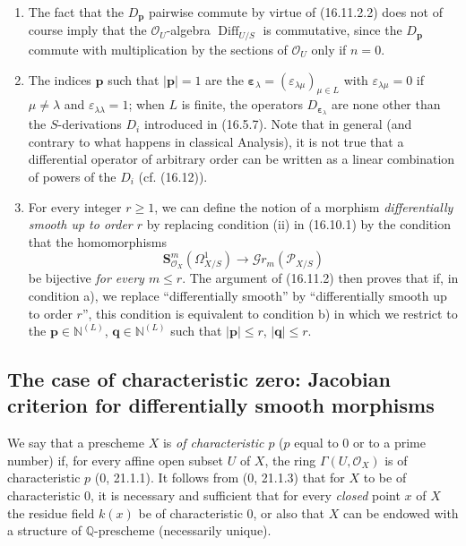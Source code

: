 \begin{remarks}[16.11.3]\label{IV.16.11.3}
\begin{enumerate}
  \item[(i)] The fact that the $D_{\mathbf{p}}$ pairwise commute by
  virtue of (16.11.2.2) does not of course imply that the
  $\mathcal{O}_U$-algebra $\operatorname{Diff}_{U/S}$ is commutative, since the
  $D_{\mathbf{p}}$ commute with multiplication by the sections of
  $\mathcal{O}_U$ only if $n=0$.
  \item[(ii)] The indices $\mathbf{p}$ such that $|\mathbf{p}|=1$ are the
  $\boldsymbol{\varepsilon}_\lambda
  =(\varepsilon_{\lambda\mu})_{\mu\in L}$ with
  $\varepsilon_{\lambda\mu}=0$ if $\mu\neq\lambda$ and
  $\varepsilon_{\lambda\lambda}=1$; when $L$ is finite, the operators
  $D_{\boldsymbol{\varepsilon}_\lambda}$ are none other than the
  $S$-derivations $D_i$ introduced in (16.5.7). Note that in general
  (and contrary to what happens in classical Analysis), it is not
  true that a differential operator of arbitrary order can be written as a
  linear combination of powers of the $D_i$ (cf. (16.12)).
  \item[(iii)] For every integer $r\geq1$, we can define the notion of a
  morphism \emph{differentially smooth up to order $r$} by replacing
  condition (ii) in (16.10.1) by the condition that the homomorphisms
  \[
    \mathbf{S}_{\mathcal{O}_X}^m(\Omega_{X/S}^1)
    \longrightarrow\mathscr{G}r_m(\mathscr{P}_{X/S})
  \]
  be bijective \emph{for every $m\leq r$}. The argument of (16.11.2)
  then proves that if, in condition a), we replace ``differentially
  smooth'' by ``differentially smooth up to order $r$'', this condition
  is equivalent to condition b) in which we restrict to the
  $\mathbf{p}\in\mathbb{N}^{(L)}$, $\mathbf{q}\in\mathbb{N}^{(L)}$ such that
  $|\mathbf{p}|\leq r$, $|\mathbf{q}|\leq r$.
\end{enumerate}
\end{remarks}

\subsection{The case of characteristic zero: Jacobian criterion for
differentially smooth morphisms}

\begin{env}[16.12.1]\label{IV.16.12.1}
We say that a prescheme $X$ is \emph{of characteristic $p$} ($p$ equal to $0$
or to a prime number) if, for every affine open subset $U$ of $X$, the ring
$\Gamma(U,\mathcal{O}_X)$ is of characteristic $p$ (0, 21.1.1). It follows
from (0, 21.1.3) that for $X$ to be of characteristic $0$, it is necessary and
sufficient that for every \emph{closed} point $x$ of $X$ the residue field
$k(x)$ be of characteristic $0$, or also that $X$ can be endowed with a
structure of $\mathbb{Q}$-prescheme (necessarily unique).
\end{env}

